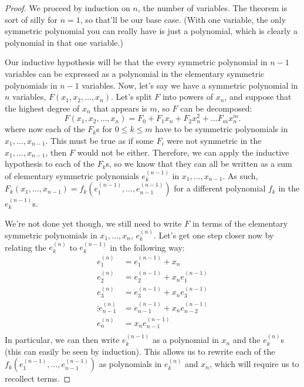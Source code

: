 \documentclass[12pt]{scrartcl}
\begin{document}
\begin{proof}
	We proceed by induction on $n$, the number of variables. The theorem is sort of silly for $n = 1$, so that'll be our base case. (With one variable, the only symmetric polynomial you can really have is just a polynomial, which is clearly a polynomial in that one variable.)

	Our inductive hypothesis will be that the every symmetric polynomial in $n-1$ variables can be expressed as a polynomial in the elementary symmetric polynomials in $n-1$ variables. Now, let's say we have a symmetric polynomial in $n$ variables, $F(x_1, x_2, \dots, x_n)$. Let's split $F$ into powers of $x_n$, and suppose that the highest degree of $x_n$ that appears is $m$, so $F$ can be decomposed:
	\[
		F(x_1, x_2, \dots, x_n) = F_0 + F_1x_n + F_2 x_n^2 + \dots F_m x_n^m
		.\]
	where now each of the $F_k$s for $0 \leq k \leq m$ have to be symmetric polynomials in $x_1, \dots, x_{n-1}$. This must be true as if some $F_i$ were not symmetric in the $x_1, \dots, x_{n-1}$, then $F$ would not be either. Therefore, we can apply the inductive hypothesis to each of the $F_k$s, so we know that they can all be written as a sum of elementary symmetric polynomials $e_k^{(n-1)}$ in $x_1, \dots, x_{n-1}$. As such, $F_k(x_1, \dots, x_{n-1}) = f_k(e_1^{(n-1)}, \dots, e_{n-1}^{(n-1)})$ for a different polynomial $f_k$ in the $e_k^{(n-1)}$s.

	We're not done yet though, we still need to write $F$ in terms of the elementary symmetric polynomials in $x_1, \dots, x_n$, $e_k^{(n)}$. Let's get one step closer now by relating the $e_k^{(n)}$ to $e_k^{(n-1)}$ in the following way:
	\begin{align*}
		e_1^{(n)}     & = e_1^{(n-1)} + x_n                     \\
		e_2^{(n)}     & = e_2^{(n-1)} + x_n e_1^{(n-1)}         \\
		e_3^{(n)}     & = e_3^{(n-1)} + x_n e_3^{(n-1)}         \\
		\vdots
		e_{n-1}^{(n)} & = e_{n-1}^{(n-1)} + x_n e_{n-2}^{(n-1)} \\
		e_n^{(n)}     & =  x_n e_{n-1}^{(n-1)}                  \\
	\end{align*}
	In particular, we can then write $e_k^{(n-1)}$ as a polynomial in $x_n$ and the $e_k^{(n)}$s (this can easily be seen by induction). This allows us to rewrite each of the $f_k(e_1^{(n-1)}, \dots, e_{n-1}^{(n-1)})$ as polynomials in $e_k^{(n)}$ and $x_n$, which will require us to recollect terms.


\end{proof}
\end{document}
